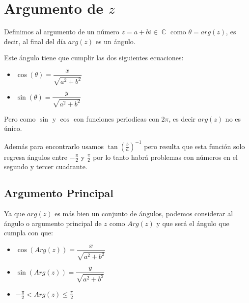 \documentclass[12pt, fleqn]{report}                             %
\newcommand{\Wrap}[1]{\left( #1 \right)}                        %
\DeclareMathOperator \Complexs  {\mathbb{C}}                     %
\newcommand{\Cos}[1]{\cos\Wrap{#1}}
\newcommand{\Sin}[1]{\sin\Wrap{#1}}
\begin{document}
        \clearpage
        \section{Argumento de $z$}
            
            Definimos al argumento de un número $z = a+bi \in \Complexs$ como $\theta = arg(z)$,
            es decir, al final del día $arg(z)$ es un ángulo.

            Este ángulo tiene que cumplir las dos siguientes ecuaciones:

            \begin{itemize}
                \item $\Cos{\theta} = \dfrac{x}{\sqrt{a^2+b^2}}$
                \item $\Sin{\theta}   = \dfrac{y}{\sqrt{a^2+b^2}}$
            \end{itemize}

            Pero como $\sin$ y $\cos$ con funciones periodicas con $2\pi$, es decir $arg(z)$ no es único.

            Además para encontrarlo usamos $\tan(\frac{b}{a})^{-1}$ pero resulta que esta función solo
            regresa ángulos entre $-\frac{\pi}{2}$ y $\frac{\pi}{2}$ por lo tanto habrá problemas con
            números en el segundo y tercer cuadrante.

            \subsection*{Argumento Principal}

                Ya que $arg(z)$ es más bien un conjunto de ángulos, podemos considerar al ángulo o 
                argumento principal de $z$ como $Arg(z)$ y que será el ángulo que cumpla con que:

                \begin{itemize}
                    \item $\Cos{Arg(z)} = \dfrac{x}{\sqrt{a^2+b^2}}$
                    \item $\Sin{Arg(z)}   = \dfrac{y}{\sqrt{a^2+b^2}}$
                    \item $-\frac{\pi}{2} < Arg(z) \leq \frac{\pi}{2}$
                \end{itemize}
\end{document}
